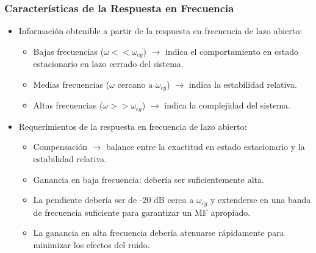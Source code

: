 \documentclass[aspectratio=169]{beamer}
\theoremstyle{definition}
\theoremstyle{plain}
\theoremstyle{remark}
\begin{document}
\begin{frame}[<+->]\frametitle{Características de la Respuesta en Frecuencia}
\begin{itemize}
	\item Información obtenible a partir de la respuesta en frecuencia de lazo abierto:
	\begin{itemize}
		\item Bajas frecuencias ($\omega << \omega_{cg}$) $\rightarrow$ indica el comportamiento en estado estacionario en lazo cerrado del sistema.
		\item Medias frecuencias ($\omega \text{ cercano a } \omega_{cg}$) $\rightarrow$ indica la estabilidad relativa.
		\item Altas frecuencias ($\omega >> \omega_{cg}$) $\rightarrow$ indica la complejidad del sistema.
	\end{itemize}
	\item Requerimientos de la respuesta en frecuencia de lazo abierto:
	\begin{itemize}
		\item Compensación $\rightarrow$ balance entre la exactitud en estado estacionario y la estabilidad relativa.
		\item Ganancia en baja frecuencia: debería ser suficientemente alta.
		\item La pendiente debería ser de -20 dB cerca a $\omega_{cg}$ y extenderse en una banda de frecuencia suficiente para garantizar un MF apropiado.
		\item La ganancia en alta frecuencia debería atenuarse rápidamente para minimizar los efectos del ruido.
	\end{itemize}
\end{itemize}
\end{frame}
\end{document}
